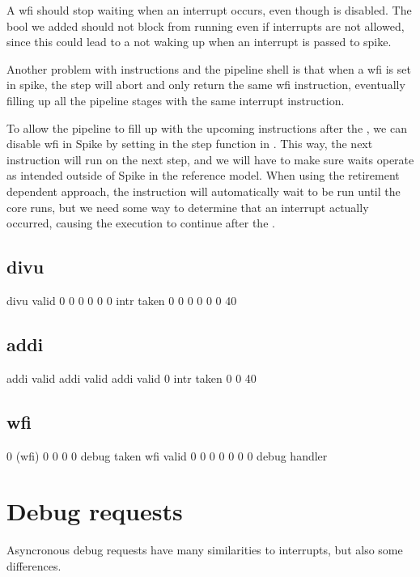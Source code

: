 A wfi should stop waiting when an interrupt occurs, even though  is disabled\cite{}. The  bool we added should not block  from running even if interrupts are not allowed, since this could lead to a  not waking up when an interrupt is passed to spike.

Another problem with  instructions and the pipeline shell is that when a wfi is set in spike, the step will abort and only return the same wfi instruction, eventually filling up all the pipeline stages with the same interrupt  instruction. 

To allow the pipeline to fill up with the upcoming instructions after the , we can disable wfi in Spike by setting  in the step function in . This way, the next instruction will run on the next step, and we will have to make sure  waits operate as intended outside of Spike in the reference model. When using the retirement dependent approach, the  instruction will automatically wait to be run until the core runs, but we need some way to determine that an interrupt actually occurred, causing the execution to continue after the . 


\subsection{divu}

divu valid
0
0
0
0
0
0 intr taken
0
0
0
0
0
0
40



\subsection{addi}

addi valid
addi valid
addi valid
0   intr taken
0
0
40

\subsection{wfi}

0 (wfi)
0
0
0
0 debug taken
wfi valid
0
0
0
0
0
0
0
debug handler


\section{Debug requests}

Asyncronous debug requests have many similarities to interrupts, but also some differences.

